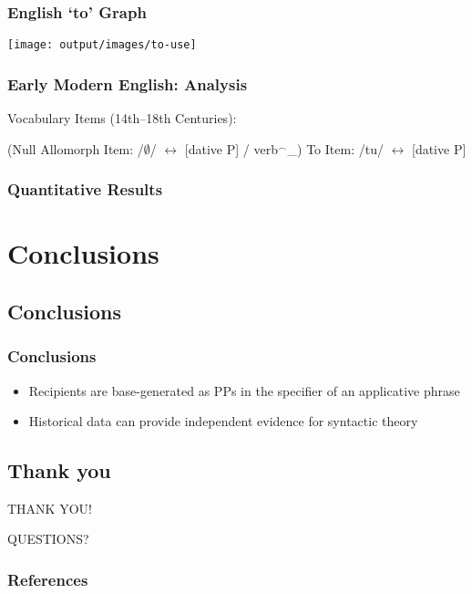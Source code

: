\documentclass{beamer}
\begin{document}
\begin{frame}
	\frametitle{English `to' Graph}
	\texttt{[image: output/images/to-use]}
\end{frame}

\begin{frame}
	\frametitle{Early Modern English: Analysis}
	\begin{exe}
		\ex Vocabulary Items (14th--18th Centuries):
		\begin{xlist}
			\ex (Null Allomorph Item: /$\emptyset$/ $\leftrightarrow$ [dative P] / verb$^{\smallfrown}$\_)
			\ex To Item: /tu/ $\leftrightarrow$ [dative P]
		\end{xlist}
	\end{exe}
\end{frame}

\begin{frame}
	\frametitle{Quantitative Results}
	
\end{frame}

\section{Conclusions}
\subsection{Conclusions}
\begin{frame}
	\frametitle{Conclusions}
	\begin{itemize}
		\item Recipients are base-generated as PPs in the specifier of an applicative phrase
		\item Historical data can provide independent evidence for syntactic theory
	\end{itemize}
\end{frame}
\subsection{Thank you}
\begin{frame}
\vfill
\begin{center}
THANK YOU!
\end{center}
\vfill
\end{frame}

\begin{frame}
\vfill
\begin{center}
	QUESTIONS?
\end{center}
\vfill
\end{frame}


\begin{frame}[allowframebreaks]
\frametitle{References}
\nocite{Haddican.2011,Haddican.2012,Gerwin.2013}

{}
\end{frame}
\end{document}
